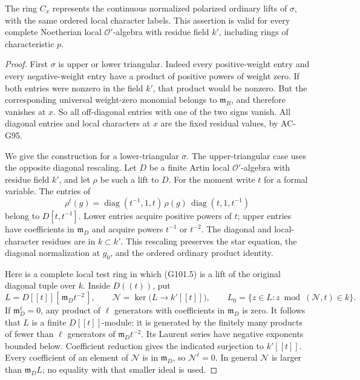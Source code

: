 \begin{lemma}
\label{lem:G101completion}
The ring \(C_x\) represents the continuous normalized polarized
ordinary lifts of \(\sigma\), with the same ordered local character
labels.  This assertion is valid for every complete Noetherian local
\(\mathcal O'\)-algebra with residue field \(k'\), including rings of
characteristic \(p\).
\end{lemma}

\begin{proof}
First \(\sigma\) is upper or lower triangular.  Indeed every
positive-weight entry and every negative-weight entry have a product
of positive powers of weight zero.  If both entries were nonzero
in the field \(k'\), that product would be nonzero.
But the corresponding universal weight-zero monomial belongs to
\(\mathfrak m_B\), and therefore vanishes at \(x\).
So all off-diagonal entries with one of the two signs vanish.
All diagonal entries and local characters at \(x\) are the fixed
residual values, by AC-G95.

We give the construction for a lower-triangular \(\sigma\).
The upper-triangular case uses the opposite diagonal rescaling.
Let \(D\) be a finite Artin local \(\mathcal O'\)-algebra with
residue field \(k'\), and let \(\rho\) be such a lift to \(D\).
For the moment write \(t\) for a formal variable.
The entries of
\[
 \rho^t(g)=
   \operatorname{diag}(t^{-1},1,t)\,
       \rho(g)\,
   \operatorname{diag}(t,1,t^{-1})
 \tag{G101.5}
\]
belong to \(D[t,t^{-1}]\).  Lower entries acquire positive powers
of \(t\); upper entries have coefficients in \(\mathfrak m_D\)
and acquire powers \(t^{-1}\) or \(t^{-2}\).
The diagonal and local-character residues are in \(k\subset k'\).
This rescaling preserves the star equation, the diagonal
normalization at \(g_0\), and the ordered ordinary product identity.

Here is a complete local test ring in which (G101.5) is a lift of
the original diagonal tuple over \(k\).
Inside \(D((t))\), put
\[
 L=D[[t]][\,\mathfrak m_Dt^{-2}\,],\qquad
 \mathcal N=\ker\bigl(L\longrightarrow k'[[t]]\bigr),\qquad
 L_0=\{z\in L:z\bmod(\mathcal N,t)\in k\}.
 \tag{G101.6}
\]
If \(\mathfrak m_D^\ell=0\), any product of \(\ell\)
generators with coefficients in \(\mathfrak m_D\) is zero.
It follows that \(L\) is a finite \(D[[t]]\)-module:
it is generated by the finitely many products of fewer than
\(\ell\) generators of \(\mathfrak m_Dt^{-2}\).
Its Laurent series have negative exponents bounded below.
Coefficient reduction gives the indicated surjection to \(k'[[t]]\).
Every coefficient of an element of \(\mathcal N\) is in
\(\mathfrak m_D\), so \(\mathcal N^\ell=0\).
In general \(\mathcal N\) is larger than
\(\mathfrak m_DL\); no equality with that smaller ideal is used.


\end{proof}
